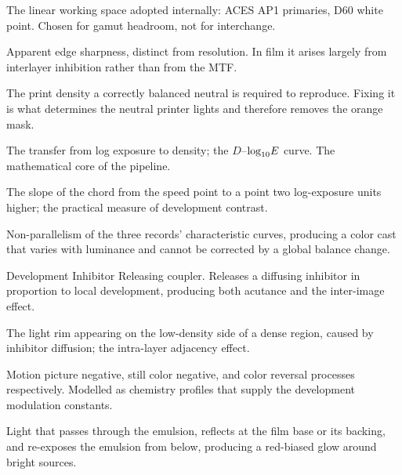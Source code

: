 \begin{description}[leftmargin=0pt,labelindent=0pt,style=nextline,itemsep=2pt]

\item[ACEScg] The linear working space adopted internally: ACES AP1 primaries,
D60 white point. Chosen for gamut headroom, not for interchange.

\item[Acutance] Apparent edge sharpness, distinct from resolution. In film it
arises largely from interlayer inhibition rather than from the MTF.

\item[Aim density] The print density a correctly balanced neutral is required
to reproduce. Fixing it is what determines the neutral printer lights and
therefore removes the orange mask.

\item[Characteristic curve] The transfer from log exposure to density; the
$D$--$\log_{10}\!E$ curve. The mathematical core of the pipeline.

\item[Contrast index] The slope of the chord from the speed point to a point
two log-exposure units higher; the practical measure of development contrast.

\item[Crossover] Non-parallelism of the three records' characteristic curves,
producing a color cast that varies with luminance and cannot be corrected by a
global balance change.

\item[DIR coupler] Development Inhibitor Releasing coupler. Releases a
diffusing inhibitor in proportion to local development, producing both acutance
and the inter-image effect.

\item[Eberhard effect] The light rim appearing on the low-density side of a
dense region, caused by inhibitor diffusion; the intra-layer adjacency effect.

\item[ECN-2, C-41, E-6] Motion picture negative, still color negative, and
color reversal processes respectively. Modelled as chemistry profiles that
supply the development modulation constants.

\item[Halation] Light that passes through the emulsion, reflects at the
film base or its backing, and re-exposes the emulsion from below, producing a
red-biased glow around bright sources.


\end{description}
